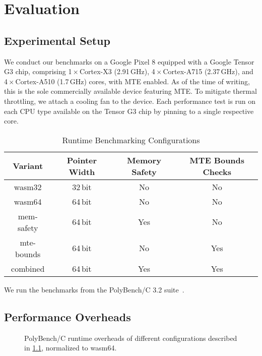 \chapter{Evaluation}
\label{ch:eval}


\section{Experimental Setup}\label{sec:experimental-setup}

We conduct our benchmarks on a Google Pixel 8 equipped with a Google Tensor G3 chip, comprising 1\,$\times$\,Cortex-X3 (2.91\,GHz), 4\,$\times$\,Cortex-A715 (2.37\,GHz), and 4\,$\times$\,Cortex-A510 (1.7\,GHz) cores, with \ac{MTE} enabled.
As of the time of writing, this is the sole commercially available device featuring \ac{MTE}.
To mitigate thermal throttling, we attach a cooling fan to the device.
Each performance test is run on each CPU type available on the Tensor G3 chip by pinning to a single respective core.

\begin{table}[ht]
    \centering
    \small
    \begin{tabular}{c || c|c|c}
        \textbf{Variant} & \textbf{Pointer Width} & \textbf{Memory Safety} & \textbf{MTE Bounds Checks} \\
        \hline
        wasm32     & 32\,bit & No  & No  \\
        wasm64     & 64\,bit & No  & No  \\
        mem-safety & 64\,bit & Yes & No  \\
        mte-bounds & 64\,bit & No  & Yes \\
        combined   & 64\,bit & Yes & Yes \\
    \end{tabular}
    \caption{Runtime Benchmarking Configurations}
    \label{tab:benchmark-variants}
\end{table}

\noindent
We run the benchmarks from the PolyBench/C 3.2 suite~\cite{polybenchc}.

\section{Performance Overheads}
\label{sec:performance-overheads}

\begin{figure}[ht]
    \centering
    
    \caption{PolyBench/C runtime overheads of different configurations described in \cref{tab:benchmark-variants}, normalized to wasm64.}
    \label{fig:runtime-overheads-combined}
\end{figure}

